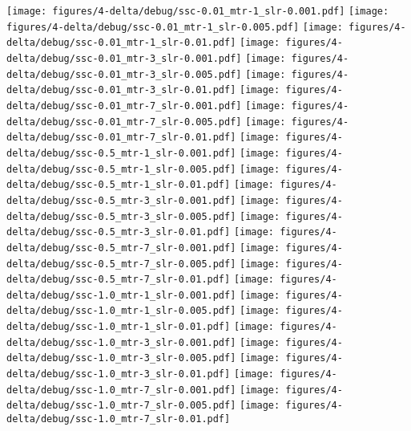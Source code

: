 \texttt{[image: figures/4-delta/debug/ssc-0.01\_mtr-1\_slr-0.001.pdf]}
\texttt{[image: figures/4-delta/debug/ssc-0.01\_mtr-1\_slr-0.005.pdf]}
\texttt{[image: figures/4-delta/debug/ssc-0.01\_mtr-1\_slr-0.01.pdf]}
\texttt{[image: figures/4-delta/debug/ssc-0.01\_mtr-3\_slr-0.001.pdf]}
\texttt{[image: figures/4-delta/debug/ssc-0.01\_mtr-3\_slr-0.005.pdf]}
\texttt{[image: figures/4-delta/debug/ssc-0.01\_mtr-3\_slr-0.01.pdf]}
\texttt{[image: figures/4-delta/debug/ssc-0.01\_mtr-7\_slr-0.001.pdf]}
\texttt{[image: figures/4-delta/debug/ssc-0.01\_mtr-7\_slr-0.005.pdf]}
\texttt{[image: figures/4-delta/debug/ssc-0.01\_mtr-7\_slr-0.01.pdf]}
\texttt{[image: figures/4-delta/debug/ssc-0.5\_mtr-1\_slr-0.001.pdf]}
\texttt{[image: figures/4-delta/debug/ssc-0.5\_mtr-1\_slr-0.005.pdf]}
\texttt{[image: figures/4-delta/debug/ssc-0.5\_mtr-1\_slr-0.01.pdf]}
\texttt{[image: figures/4-delta/debug/ssc-0.5\_mtr-3\_slr-0.001.pdf]}
\texttt{[image: figures/4-delta/debug/ssc-0.5\_mtr-3\_slr-0.005.pdf]}
\texttt{[image: figures/4-delta/debug/ssc-0.5\_mtr-3\_slr-0.01.pdf]}
\texttt{[image: figures/4-delta/debug/ssc-0.5\_mtr-7\_slr-0.001.pdf]}
\texttt{[image: figures/4-delta/debug/ssc-0.5\_mtr-7\_slr-0.005.pdf]}
\texttt{[image: figures/4-delta/debug/ssc-0.5\_mtr-7\_slr-0.01.pdf]}
\texttt{[image: figures/4-delta/debug/ssc-1.0\_mtr-1\_slr-0.001.pdf]}
\texttt{[image: figures/4-delta/debug/ssc-1.0\_mtr-1\_slr-0.005.pdf]}
\texttt{[image: figures/4-delta/debug/ssc-1.0\_mtr-1\_slr-0.01.pdf]}
\texttt{[image: figures/4-delta/debug/ssc-1.0\_mtr-3\_slr-0.001.pdf]}
\texttt{[image: figures/4-delta/debug/ssc-1.0\_mtr-3\_slr-0.005.pdf]}
\texttt{[image: figures/4-delta/debug/ssc-1.0\_mtr-3\_slr-0.01.pdf]}
\texttt{[image: figures/4-delta/debug/ssc-1.0\_mtr-7\_slr-0.001.pdf]}
\texttt{[image: figures/4-delta/debug/ssc-1.0\_mtr-7\_slr-0.005.pdf]}
\texttt{[image: figures/4-delta/debug/ssc-1.0\_mtr-7\_slr-0.01.pdf]}
